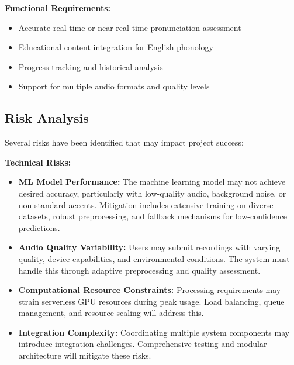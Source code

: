 \documentclass[a4paper,12pt]{report}
\begin{document}
\textbf{Functional Requirements:}
\begin{itemize}
    \item Accurate real-time or near-real-time pronunciation assessment
    \item Educational content integration for English phonology
    \item Progress tracking and historical analysis
    \item Support for multiple audio formats and quality levels
\end{itemize}

\subsection{Risk Analysis}
Several risks have been identified that may impact project success:

\textbf{Technical Risks:}
\begin{itemize}
    \item \textbf{ML Model Performance:} The machine learning model may not achieve desired accuracy, particularly with low-quality audio, background noise, or non-standard accents. Mitigation includes extensive training on diverse datasets, robust preprocessing, and fallback mechanisms for low-confidence predictions.
    \item \textbf{Audio Quality Variability:} Users may submit recordings with varying quality, device capabilities, and environmental conditions. The system must handle this through adaptive preprocessing and quality assessment.
    \item \textbf{Computational Resource Constraints:} Processing requirements may strain serverless GPU resources during peak usage. Load balancing, queue management, and resource scaling will address this.
    \item \textbf{Integration Complexity:} Coordinating multiple system components may introduce integration challenges. Comprehensive testing and modular architecture will mitigate these risks.
\end{itemize}
\end{document}
